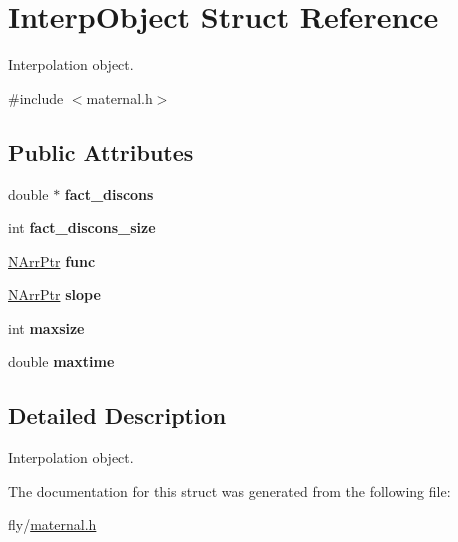 \hypertarget{structInterpObject}{
\section{InterpObject Struct Reference}
\label{structInterpObject}
}


Interpolation object.  


{\ttfamily \#include $<$maternal.h$>$}\subsection*{Public Attributes}
\begin{DoxyCompactItemize}
\item 
\hypertarget{structInterpObject_a99c3889a6ecd8d405d14d0c415bb1004}{
double $\ast$ {\bfseries fact\_\-discons}}
\label{structInterpObject_a99c3889a6ecd8d405d14d0c415bb1004}

\item 
\hypertarget{structInterpObject_a6a1fc721c4094204e15457ea93f60bf9}{
int {\bfseries fact\_\-discons\_\-size}}
\label{structInterpObject_a6a1fc721c4094204e15457ea93f60bf9}

\item 
\hypertarget{structInterpObject_a723d965bb98b803da36c373f41b1bc6c}{
\hyperlink{structNArrPtr}{NArrPtr} {\bfseries func}}
\label{structInterpObject_a723d965bb98b803da36c373f41b1bc6c}

\item 
\hypertarget{structInterpObject_a3708d7be9e486253f4240045d2258cf7}{
\hyperlink{structNArrPtr}{NArrPtr} {\bfseries slope}}
\label{structInterpObject_a3708d7be9e486253f4240045d2258cf7}

\item 
\hypertarget{structInterpObject_a745ade3ab7ef0bb2e7a978e3e253b075}{
int {\bfseries maxsize}}
\label{structInterpObject_a745ade3ab7ef0bb2e7a978e3e253b075}

\item 
\hypertarget{structInterpObject_af58ff681d6eaf18cad29862b81ee5866}{
double {\bfseries maxtime}}
\label{structInterpObject_af58ff681d6eaf18cad29862b81ee5866}

\end{DoxyCompactItemize}


\subsection{Detailed Description}
Interpolation object. 

The documentation for this struct was generated from the following file:\begin{DoxyCompactItemize}
\item 
fly/\hyperlink{maternal_8h}{maternal.h}\end{DoxyCompactItemize}
